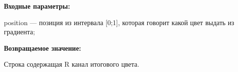 \textbf{Входные параметры:}  

position --- позиция из интервала [0;1], которая говорит какой цвет выдать из градиента;

\textbf{Возвращаемое значение:}

Строка содержащая R канал итогового цвета.